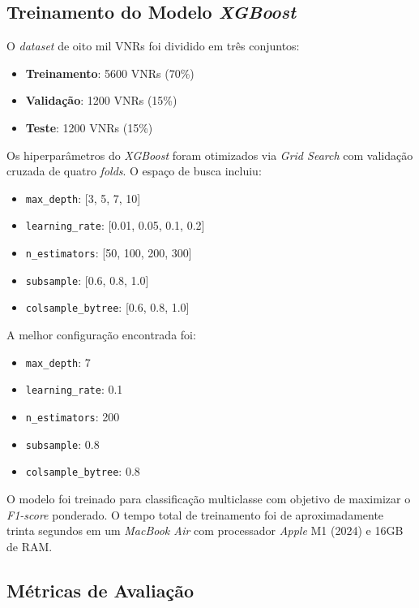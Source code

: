 \documentclass[conference]{IEEEtran}
\begin{document}
\subsection{Treinamento do Modelo \textit{XGBoost}}

O \textit{dataset} de oito mil VNRs foi dividido em três conjuntos:
\begin{itemize}
    \item \textbf{Treinamento}: 5600 VNRs (70\%)
    \item \textbf{Validação}: 1200 VNRs (15\%)
    \item \textbf{Teste}: 1200 VNRs (15\%)
\end{itemize}

Os hiperparâmetros do \textit{XGBoost} foram otimizados via \textit{Grid Search} com validação cruzada de quatro \textit{folds}. O espaço de busca incluiu:

\begin{itemize}
    \item \texttt{max\_depth}: [3, 5, 7, 10]
    \item \texttt{learning\_rate}: [0.01, 0.05, 0.1, 0.2]
    \item \texttt{n\_estimators}: [50, 100, 200, 300]
    \item \texttt{subsample}: [0.6, 0.8, 1.0]
    \item \texttt{colsample\_bytree}: [0.6, 0.8, 1.0]
\end{itemize}

A melhor configuração encontrada foi:
\begin{itemize}
    \item \texttt{max\_depth}: 7
    \item \texttt{learning\_rate}: 0.1
    \item \texttt{n\_estimators}: 200
    \item \texttt{subsample}: 0.8
    \item \texttt{colsample\_bytree}: 0.8
\end{itemize}

O modelo foi treinado para classificação multiclasse com objetivo de maximizar o \textit{F1-score} ponderado. O tempo total de treinamento foi de aproximadamente trinta segundos em um \textit{MacBook Air} com processador \textit{Apple} M1 (2024) e 16GB de RAM.

\subsection{Métricas de Avaliação}
\end{document}
